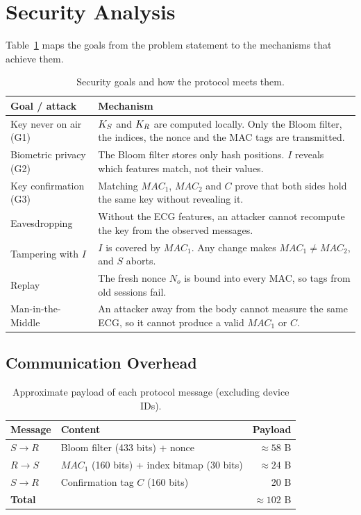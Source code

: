 \section{Security Analysis}
\label{sec:security}

Table~\ref{tab:security} maps the goals from the problem statement to the mechanisms that achieve them.

\begin{table}[htbp]
  \centering
  \caption{Security goals and how the protocol meets them.}
  \label{tab:security}
  \begin{tabularx}{\textwidth}{>{\raggedright\arraybackslash}p{3.3cm} X}
    \toprule
    \textbf{Goal / attack} & \textbf{Mechanism} \\
    \midrule
    Key never on air (G1)  & $K_S$ and $K_R$ are computed locally. Only the Bloom filter, the indices, the nonce and the MAC tags are transmitted. \\
    Biometric privacy (G2) & The Bloom filter stores only hash positions. $I$ reveals which features match, not their values. \\
    Key confirmation (G3)  & Matching $\mathit{MAC}_1$, $\mathit{MAC}_2$ and $C$ prove that both sides hold the same key without revealing it. \\
    Eavesdropping          & Without the ECG features, an attacker cannot recompute the key from the observed messages. \\
    Tampering with $I$     & $I$ is covered by $\mathit{MAC}_1$. Any change makes $\mathit{MAC}_1 \neq \mathit{MAC}_2$, and $S$ aborts. \\
    Replay                 & The fresh nonce $N_o$ is bound into every MAC, so tags from old sessions fail. \\
    Man-in-the-Middle      & An attacker away from the body cannot measure the same ECG, so it cannot produce a valid $\mathit{MAC}_1$ or $C$. \\
    \bottomrule
  \end{tabularx}
\end{table}

\subsection{Communication Overhead}
\begin{table}[htbp]
  \centering
  \caption{Approximate payload of each protocol message (excluding device IDs).}
  \label{tab:overhead}
  \begin{tabular}{l l r}
    \toprule
    \textbf{Message} & \textbf{Content} & \textbf{Payload} \\
    \midrule
    $S \to R$ & Bloom filter (433 bits) + nonce               & $\approx 58$ B \\
    $R \to S$ & $\mathit{MAC}_1$ (160 bits) + index bitmap (30 bits) & $\approx 24$ B \\
    $S \to R$ & Confirmation tag $C$ (160 bits)              & 20 B \\
    \midrule
    \textbf{Total} &                                       & $\approx 102$ B \\
    \bottomrule
  \end{tabular}
\end{table}

